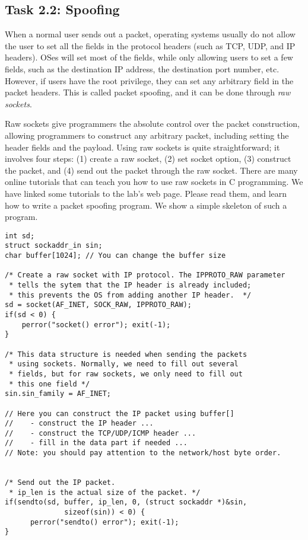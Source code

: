 \subsection{Task 2.2: Spoofing}

When a normal user sends out a packet, operating systems
usually do not allow the user to set all the fields in the protocol 
headers (such as TCP, UDP, and IP headers). OSes will
set most of the fields, while only allowing users to 
set a few fields, such as the destination IP address, 
the destination port number, etc.  However, if 
users have the root privilege, they can set any 
arbitrary field in the packet headers. This is 
called packet spoofing, and it can be done through
{\em raw sockets}. 


Raw sockets give programmers the absolute control over the packet 
construction, allowing programmers to construct any arbitrary packet, including 
setting the header fields and the payload. Using raw sockets is 
quite straightforward; it involves four steps: (1) create a raw socket,
(2) set socket option, (3) construct the packet, and (4) send 
out the packet through the raw socket. There are 
many online tutorials that can teach you how to 
use raw sockets in C programming. We have linked some tutorials
to the lab's web page. Please read them, and learn how to 
write a packet spoofing program. We show a simple skeleton of 
such a program. 


\begin{lstlisting}
int sd;
struct sockaddr_in sin;
char buffer[1024]; // You can change the buffer size

/* Create a raw socket with IP protocol. The IPPROTO_RAW parameter
 * tells the sytem that the IP header is already included;
 * this prevents the OS from adding another IP header.  */
sd = socket(AF_INET, SOCK_RAW, IPPROTO_RAW);
if(sd < 0) {
    perror("socket() error"); exit(-1);
}

/* This data structure is needed when sending the packets 
 * using sockets. Normally, we need to fill out several 
 * fields, but for raw sockets, we only need to fill out
 * this one field */
sin.sin_family = AF_INET;

// Here you can construct the IP packet using buffer[]  
//    - construct the IP header ...
//    - construct the TCP/UDP/ICMP header ...
//    - fill in the data part if needed ...
// Note: you should pay attention to the network/host byte order.


/* Send out the IP packet. 
 * ip_len is the actual size of the packet. */  
if(sendto(sd, buffer, ip_len, 0, (struct sockaddr *)&sin, 
              sizeof(sin)) < 0) {
      perror("sendto() error"); exit(-1);
}
\end{lstlisting}



